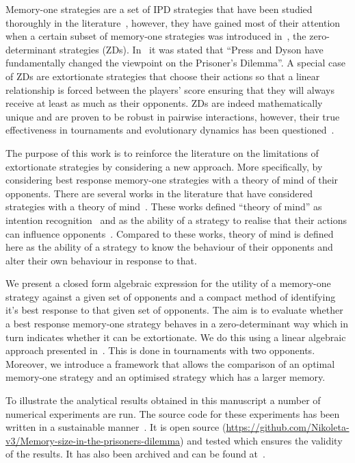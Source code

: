 \documentclass[10pt]{article}
\begin{document}
Memory-one strategies are a set of IPD strategies that have been
studied thoroughly in the literature~\cite{Nowak1990, Nowak1993}, however, they have gained
most of their attention when a certain subset of memory-one strategies was
introduced in~\cite{Press2012}, the zero-determinant strategies (ZDs). In~\cite{Stewart2012} it
was stated that ``Press and Dyson have fundamentally changed the viewpoint on
the Prisoner's Dilemma''.
A special case of ZDs are extortionate strategies that choose their actions so that a linear relationship is forced
between the players' score ensuring that they will always
receive at least as much as their opponents. ZDs are
indeed mathematically unique and are proven to be robust in pairwise
interactions, however, their true effectiveness in tournaments and
evolutionary dynamics has been questioned~\cite{adami2013, Hilbe2013b,
Hilbe2013, Hilbe2015, Knight2018, Harper2015}.

The purpose of this work is to reinforce the literature on the limitations of
extortionate strategies by considering a new approach. More specifically, by
considering best response memory-one strategies with a theory of mind of
their opponents. There are several works in the literature that have considered
strategies with a theory of mind~\cite{Han2011, De2013, Devaine2014, Han2012,
Press2012, Stewart2012}. These works defined ``theory of mind'' as intention
recognition~\cite{Han2011, Han2012, De2013, Devaine2014} and as the ability of a
strategy to realise that their actions can influence
opponents~\cite{Stewart2012}. Compared to these works, theory of mind is defined
here as the ability of a strategy to know the behaviour of their opponents
and alter their own behaviour in response to that.

We present a closed form algebraic expression for the utility of a
memory-one strategy against a given set of opponents and a compact method of
identifying it's best response to that given set of opponents.
The aim is to evaluate whether a best response memory-one
strategy behaves in a zero-determinant way which in turn indicates whether it
can be extortionate. We do this using a linear algebraic approach presented
in~\cite{Knight2019}. This is done in tournaments with two opponents.
Moreover, we introduce a framework that allows the comparison of
an optimal memory-one strategy and an optimised strategy which has a larger
memory.

To illustrate the analytical results obtained in this manuscript a number of
numerical experiments are run. The source code for these experiments has been
written in a sustainable manner~\cite{Benureau2018}.
It is open source (\url{https://github.com/Nikoleta-v3/Memory-size-in-the-prisoners-dilemma})
and tested which ensures the validity of the results. It has also been archived
and can be found at~\cite{nikoleta_glynatsi_2019}.
\end{document}
